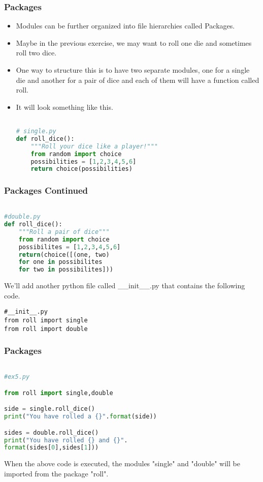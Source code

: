 \documentclass{beamer}
\begin{document}
\begin{frame}[fragile]
\frametitle{Packages}
\begin{itemize}
\item Modules can be further organized into file hierarchies called Packages.
\item Maybe in the previous exercise, we may want to roll one die and sometimes roll two dice.
\item One way to structure this is to have two separate modules, one for a single die and another for a pair of dice and each of them will have a function called roll.
\item It will look something like this. 
\begin{lstlisting}[language=Python]

# single.py
def roll_dice():
	"""Roll your dice like a player!"""
	from random import choice
	possibilities = [1,2,3,4,5,6]
	return choice(possibilities)
\end{lstlisting}

\end{itemize}
\end{frame}

\begin{frame}[fragile]
\frametitle{Packages Continued}
 
\begin{lstlisting}[language=Python]

#double.py
def roll_dice():
	"""Roll a pair of dice"""
	from random import choice
	possibilites = [1,2,3,4,5,6]
	return(choice([(one, two) 
	for one in possibilites 
	for two in possibilites]))
\end{lstlisting}
We'll add another python file called \_\_init\_\_.py that contains the following code.
\begin{lstlisting}
#__init__.py
from roll import single
from roll import double

\end{lstlisting}

\end{frame}

\begin{frame}[fragile]
\frametitle{Packages}
 
\begin{lstlisting}[language=Python]

#ex5.py

from roll import single,double

side = single.roll_dice()
print("You have rolled a {}".format(side))

sides = double.roll_dice()
print("You have rolled {} and {}".
format(sides[0],sides[1]))
\end{lstlisting}

When the above code is executed, the modules "single" and "double" will be imported from the package "roll".	

\end{frame}
\end{document}

